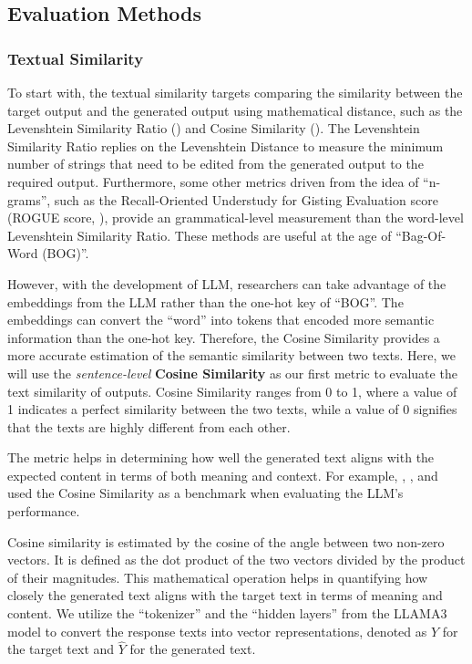 \subsection*{Evaluation Methods}


\subsubsection*{Textual Similarity}

To start with, the textual similarity targets comparing the similarity between the target output and the generated output using mathematical distance, such as the Levenshtein Similarity Ratio (\cite{levenshtein1966binary}) and Cosine Similarity (\cite{tanguy2016natural}). The Levenshtein Similarity Ratio replies on the Levenshtein Distance to measure the minimum number of strings that need to be edited from the generated output to the required output. Furthermore, some other metrics driven from the idea of ``n-grams'', such as the Recall-Oriented Understudy for Gisting Evaluation score (ROGUE score, \cite{lin2004rouge}), provide an grammatical-level measurement than the word-level Levenshtein Similarity Ratio. These methods are useful at the age of ``Bag-Of-Word (BOG)''.

However, with the development of LLM, researchers can take advantage of the embeddings from the LLM rather than the one-hot key of ``BOG''. The embeddings can convert the ``word'' into tokens that encoded more semantic information than the one-hot key. Therefore, the Cosine Similarity provides a more accurate estimation of the semantic similarity between two texts. Here, we will use the \textit{sentence-level} \textbf{Cosine Similarity} as our first metric to evaluate the text similarity of outputs. Cosine Similarity ranges from 0 to 1, where a value of 1 indicates a perfect similarity between the two texts, while a value of 0 signifies that the texts are highly different from each other.

The metric helps in determining how well the generated text aligns with the expected content in terms of both meaning and context. For example, \cite{aynetdinov2024semscore}, \cite{kim2024comparison}, and \cite{yauney2023data} used the Cosine Similarity as a benchmark when evaluating the LLM's performance.

Cosine similarity is estimated by the cosine of the angle between two non-zero vectors. It is defined as the dot product of the two vectors divided by the product of their magnitudes. This mathematical operation helps in quantifying how closely the generated text aligns with the target text in terms of meaning and content. We utilize the ``tokenizer'' and the ``hidden layers'' from the LLAMA3 model to convert the response texts into vector representations, denoted as $Y$ for the target text and $\hat{Y}$ for the generated text.


